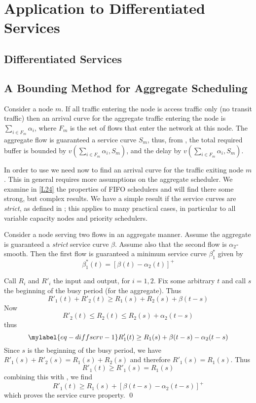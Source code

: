 
\section{Application to Differentiated Services} 
\subsection{Differentiated Services}

\subsection{A Bounding Method for Aggregate Scheduling}
Consider a node $m$. If all traffic
entering the node is access traffic only (no transit traffic) then
an arrival curve for the aggregate traffic entering the node is
$\sum_{i \in F_m} \alpha_i$, where $F_m$ is the set of flows that
enter the network at this node. The aggregate flow is guaranteed a
service curve $S_m$, thus, from , the total required
buffer is bounded by $v(\sum_{i \in F_m} \alpha_i, S_m)$, and the
delay by $v(\sum_{i \in F_m} \alpha_i, S_m)$.

In order to use  we need now to find an arrival
curve for the traffic exiting node $m$. This in general requires
more assumptions on the aggregate scheduler. We examine in
\cref{L24} the properties of FIFO schedulers and will find there
some strong, but complex results. We have a simple result if the
service curves are \emph{strict}, as defined in ;
this applies to many practical cases, in particular to all
variable capacity nodes and priority schedulers.
\begin{theorem}
Consider a node serving two flows in an aggregate manner. Assume
the aggregate is guaranteed a \emph{strict} service curve $\beta$.
Assume also that the second flow is $\alpha_2$-smooth. Then the
first flow is guaranteed a minimum service curve $\beta^*_1$ given
by
 $$
\beta^*_1(t)= [\beta(t) - \alpha_2(t)]^+
 $$
\end{theorem}
\pr
Call $R_i$ and $R'_i$ the input and output, for $i=1,2$. Fix some
arbitrary $t$ and call $s$ the beginning of the busy period (for
the aggregate). Thus
$$
R'_1(t) + R'_2(t) \geq R_1(s) + R_2(s) + \beta(t-s)
$$
Now
$$
R'_2 (t) \leq R_2(t) \leq R_2(s) + \alpha_2(t-s)
$$
thus
\begin{equation}\mylabel{eq-diffserv-1}
  R'_1(t)  \geq R_1(s) + \beta(t-s) - \alpha_2(t-s)
\end{equation}
Since $s$ is the beginning of the busy period, we have
$R'_1(s)+R'_2(s)=R_1(s)+R_2(s)$ and therefore $R'_1(s)=R_1(s)$.
Thus
$$
 R'_1(t)  \geq R'_1(s) =R_1(s)
$$
combining this with , we find
$$
R'_1(t)  \geq R_1(s) + [\beta(t-s) - \alpha_2(t-s)]^+
$$
which proves the service curve property. \qed

